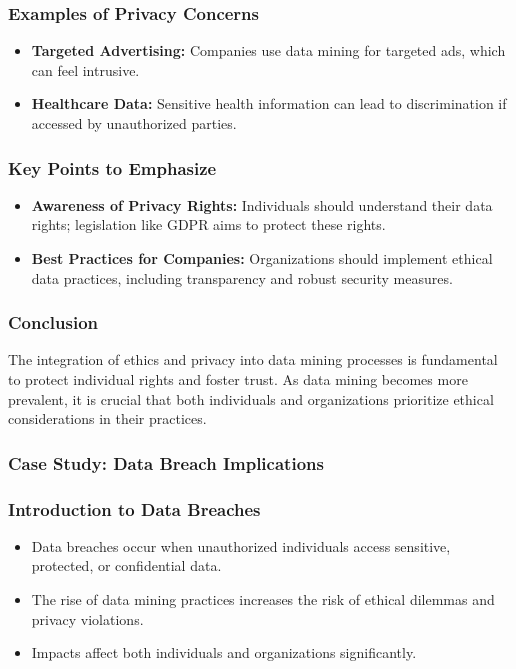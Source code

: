 \documentclass{beamer}
\begin{document}
\begin{frame}[fragile]
    \frametitle{Examples of Privacy Concerns}
    \begin{itemize}
        \item \textbf{Targeted Advertising:} Companies use data mining for targeted ads, which can feel intrusive.
        \item \textbf{Healthcare Data:} Sensitive health information can lead to discrimination if accessed by unauthorized parties.
    \end{itemize}
\end{frame}

\begin{frame}[fragile]
    \frametitle{Key Points to Emphasize}
    \begin{itemize}
        \item \textbf{Awareness of Privacy Rights:} Individuals should understand their data rights; legislation like GDPR aims to protect these rights.
        \item \textbf{Best Practices for Companies:} Organizations should implement ethical data practices, including transparency and robust security measures.
    \end{itemize}
\end{frame}

\begin{frame}[fragile]
    \frametitle{Conclusion}
    The integration of ethics and privacy into data mining processes is fundamental to protect individual rights and foster trust. 
    As data mining becomes more prevalent, it is crucial that both individuals and organizations prioritize ethical considerations in their practices.
\end{frame}

\begin{frame}[fragile]
    \frametitle{Case Study: Data Breach Implications}
\end{frame}

\begin{frame}[fragile]
    \frametitle{Introduction to Data Breaches}
    \begin{itemize}
        \item Data breaches occur when unauthorized individuals access sensitive, protected, or confidential data.
        \item The rise of data mining practices increases the risk of ethical dilemmas and privacy violations.
        \item Impacts affect both individuals and organizations significantly.
    \end{itemize}
\end{frame}
\end{document}
